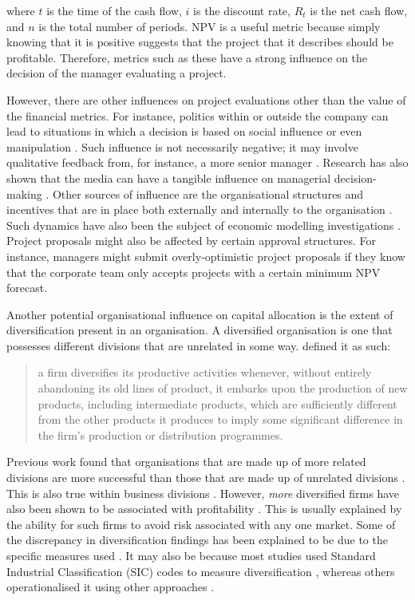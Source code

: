 \documentclass[a4paper, nobind]{templates/ociamthesis}
\theoremstyle{definition}
\theoremstyle{definition}
\theoremstyle{definition}
\theoremstyle{definition}
\theoremstyle{remark}
\begin{document}
where \(t\) is the time of the cash flow, \(i\) is the discount rate, \(R_t\) is the
net cash flow, and \(n\) is the total number of periods. NPV is a useful metric
because simply knowing that it is positive suggests that the project that it
describes should be profitable. Therefore, metrics such as these have a strong
influence on the decision of the manager evaluating a project.

However, there are other influences on project evaluations other than the value
of the financial metrics. For instance, politics within or outside the company
can lead to situations in which a decision is based on social influence or even
manipulation \autocite{garbuio2017}. Such influence is not necessarily negative; it may
involve qualitative feedback from, for instance, a more senior manager
\autocite{thamhain2014}. Research has also shown that the media can have a tangible
influence on managerial decision-making \autocite{bednar2013,liu2013}. Other sources
of influence are the organisational structures and incentives that are in place
both externally \autocite{kokkinis2019} and internally to the organisation
\autocite{ullrich2004,rajan2000}. Such dynamics have also been the subject of economic
modelling investigations \autocite{reichelstein1997,cavagnac2005,ortner2017}.
Project proposals might also be affected by certain approval structures. For
instance, managers might submit overly-optimistic project proposals if they know
that the corporate team only accepts projects with a certain minimum NPV
forecast.

Another potential organisational influence on capital allocation is the extent
of diversification present in an organisation. A diversified organisation is one
that possesses different divisions that are unrelated in some way. \textcite[p.~96]{penrose2009} defined it as such:

\begin{quote}
a firm diversifies its productive activities whenever, without entirely
abandoning its old lines of product, it embarks upon the production of new
products, including intermediate products, which are sufficiently different
from the other products it produces to imply some significant difference in
the firm's production or distribution programmes.
\end{quote}

Previous work found that organisations that are made up of more related
divisions are more successful than those that are made up of unrelated divisions
\autocite{harrison1993,rumelt1974,shelton1988,wernerfelt1988}. This is also true
within business divisions \autocite{davis1992}. However, \emph{more} diversified firms have
also been shown to be associated with profitability \autocite{grant1988}. This is
usually explained by the ability for such firms to avoid risk associated with
any one market. Some of the discrepancy in diversification findings has been
explained to be due to the specific measures used \autocite{lubatkin1986}. It may also
be because most studies used Standard Industrial Classification (SIC) codes to
measure diversification \autocite[e.g.,][]{rumelt1974}, whereas others operationalised it
using other approaches \autocite[e.g., resource-based;][]{harrison1993}.
\end{document}
